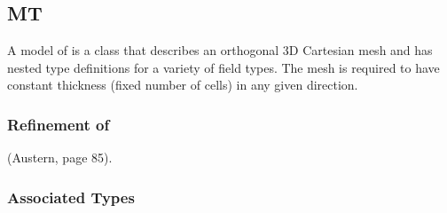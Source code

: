 \documentclass[11pt]{rnote}
\begin{document}
\subsection{MT}
A model of  is a class that describes an orthogonal 3D
Cartesian mesh and has nested type definitions for a variety of field
types. The mesh is required to have constant thickness (fixed number
of cells) in any given direction.

\subsubsection{Refinement of}
 (Austern, page 85).

\subsubsection{Associated Types}
\end{document}
